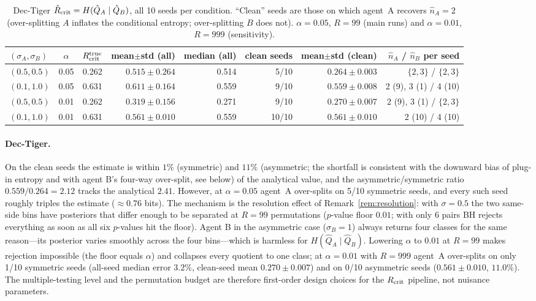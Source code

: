 \documentclass[10pt]{article}
\begin{document}
\begin{table}[h]
\centering
\caption{Dec-Tiger $\hat R_{\rm crit}=H(\hat Q_A\mid\hat Q_B)$, all 10 seeds
  per condition.  ``Clean'' seeds are those on which agent~A recovers
  $\hat n_A=2$ (over-splitting $A$ inflates the conditional entropy; over-splitting
  $B$ does not).  $\alpha=0.05$, $R=99$ (main runs) and $\alpha=0.01$, $R=999$
  (sensitivity).}
\label{tab:rcrit}
\small
\begin{tabular}{lccrrrrr}
\toprule
$(\sigma_A,\sigma_B)$ & $\alpha$ & $R^{\rm true}_{\rm crit}$ & mean$\pm$std (all) & median (all) & clean seeds & mean$\pm$std (clean) & $\hat n_A$ / $\hat n_B$ per seed \\
\midrule
$(0.5,0.5)$ & 0.05 & 0.262 & $0.515\pm0.264$ & 0.514 & 5/10 & $0.264\pm0.003$ & $\{2,3\}$ / $\{2,3\}$ \\
$(0.1,1.0)$ & 0.05 & 0.631 & $0.611\pm0.164$ & 0.559 & 9/10 & $0.559\pm0.008$ & 2 (9), 3 (1) / 4 (10) \\
$(0.5,0.5)$ & 0.01 & 0.262 & $0.319\pm0.156$ & 0.271 & 9/10 & $0.270\pm0.007$ & 2 (9), 3 (1) / $\{2,3\}$ \\
$(0.1,1.0)$ & 0.01 & 0.631 & $0.561\pm0.010$ & 0.559 & 10/10 & $0.561\pm0.010$ & 2 (10) / 4 (10) \\
\bottomrule
\end{tabular}
\end{table}

\paragraph{Dec-Tiger.}
On the clean seeds the estimate is within $1\%$ (symmetric) and $11\%$
(asymmetric; the shortfall is consistent with the downward bias of plug-in
entropy and with agent B's four-way over-split, see below) of the analytical
value, and the asymmetric/symmetric ratio $0.559/0.264=2.12$ tracks the
analytical $2.41$.  However, at $\alpha=0.05$ agent~A over-splits on 5/10
symmetric seeds, and every such seed roughly triples the estimate
($\approx0.76$ bits).  The mechanism is the resolution effect of
Remark~\ref{rem:resolution}: with $\sigma=0.5$ the two same-side bins have
posteriors that differ enough to be separated at $R=99$ permutations
($p$-value floor $0.01$; with only 6 pairs BH rejects everything as soon as all
six $p$-values hit the floor).  Agent B in the asymmetric case ($\sigma_B=1$)
always returns four classes for the same reason---its posterior varies smoothly
across the four bins---which is harmless for $H(\hat Q_A\mid\hat Q_B)$.
Lowering $\alpha$ to $0.01$ at $R=99$ makes rejection impossible (the floor
equals $\alpha$) and collapses every quotient to one class; at $\alpha=0.01$ with $R=999$ agent~A over-splits on only 1/10 symmetric seeds (all-seed median error $3.2\%$, clean-seed mean $0.270\pm0.007$) and on 0/10 asymmetric seeds ($0.561\pm0.010$, $11.0\%$).  The multiple-testing level and the permutation budget are therefore first-order design choices for the $R_{\rm crit}$ pipeline, not nuisance parameters.
\end{document}
